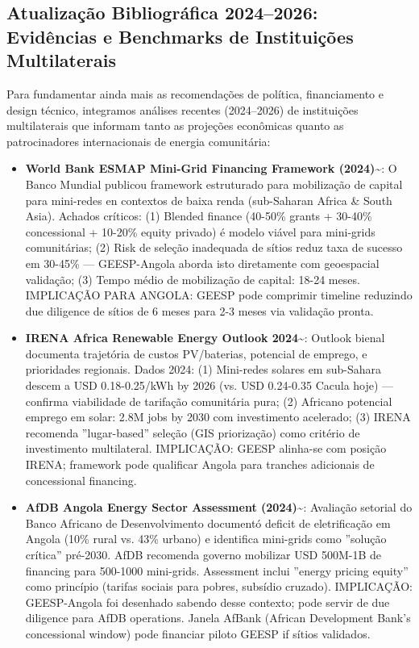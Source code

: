 \documentclass[12pt, a4paper]{article}
\begin{document}
\subsection{Atualização Bibliográfica 2024--2026: Evidências e Benchmarks de Instituições Multilaterais}

Para fundamentar ainda mais as recomendações de política, financiamento e design técnico, integramos análises recentes (2024--2026) de instituições multilaterais que informam tanto as projeções econômicas quanto as patrocinadores internacionais de energia comunitária:

\begin{itemize}

  \item \textbf{World Bank ESMAP Mini-Grid Financing Framework (2024)}\textasciitilde{}\citep{WorldBank2024}: O Banco Mundial publicou framework estruturado para mobilização de capital para mini-redes en contextos de baixa renda (sub-Saharan Africa \& South Asia). Achados críticos: (1) Blended finance (40-50\% grants + 30-40\% concessional + 10-20\% equity privado) é modelo viável para mini-grids comunitárias; (2) Risk de seleção inadequada de sítios reduz taxa de sucesso em 30-45\% — GEESP-Angola aborda isto diretamente com geoespacial validação; (3) Tempo médio de mobilização de capital: 18-24 meses. IMPLICAÇÃO PARA ANGOLA: GEESP pode comprimir timeline reduzindo due diligence de sítios de 6 meses para 2-3 meses via validação pronta.
  
  \item \textbf{IRENA Africa Renewable Energy Outlook 2024}\textasciitilde{}\citep{IRENA2024}: Outlook bienal documenta trajetória de custos PV/baterias, potencial de emprego, e prioridades regionais. Dados 2024: (1) Mini-redes solares em sub-Sahara descem a USD 0.18-0.25/kWh by 2026 (vs. USD 0.24-0.35 Cacula hoje) — confirma viabilidade de tarifação comunitária pura; (2) Africano potencial emprego em solar: 2.8M jobs by 2030 com investimento acelerado; (3) IRENA recomenda ''lugar-based'' seleção (GIS priorização) como critério de investimento multilateral. IMPLICAÇÃO: GEESP alinha-se com posição IRENA; framework pode qualificar Angola para tranches adicionais de concessional financing.
  
  \item \textbf{AfDB Angola Energy Sector Assessment (2024)}\textasciitilde{}\citep{AfDB2024}: Avaliação setorial do Banco Africano de Desenvolvimento documentó deficit de eletrificação em Angola (10\% rural vs. 43\% urbano) e identifica mini-grids como ''solução crítica'' pré-2030. AfDB recomenda governo mobilizar USD 500M-1B de financing para 500-1000 mini-grids. Assessment inclui ''energy pricing equity'' como princípio (tarifas sociais para pobres, subsídio cruzado). IMPLICAÇÃO: GEESP-Angola foi desenhado sabendo desse contexto; pode servir de due diligence para AfDB operations. Janela AfBank (African Development Bank's concessional window) pode financiar piloto GEESP if sítios validados.
  

\end{itemize}
\end{document}
